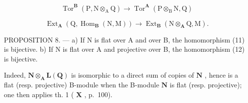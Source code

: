 \[
\operatorname{Tor} ^ {\mathbf {B}} (\mathrm{P}, \mathrm{N} \otimes_ {\mathrm{A}} \mathrm{Q}) \rightarrow \operatorname{Tor} ^ {\mathbf {A}} (\mathrm{P} \otimes_ {\mathrm{B}} \mathrm{N}, \mathrm{Q})\tag{12}
\]

\[
\operatorname{Ext} _ {\mathbf {A}} \left(\mathrm{Q}, \operatorname{Hom} _ {\mathbf {B}} (\mathrm{N}, \mathrm{M})\right)\rightarrow \operatorname{Ext} _ {\mathbf {B}} \left(\mathrm{N} \otimes_ {\mathbf {A}} \mathrm{Q}, \mathrm{M}\right).
\]

PROPOSITION 8. --- a) If N is flat over A and over B, the homomorphism (11) is bijective. b) If N is flat over A and projective over B, the homomorphism (12) is bijective.

Indeed, \(\mathbf{N} \otimes_{\mathbf{A}} \mathbf{L}(\mathbf{Q})\) is isomorphic to a direct sum of copies of \(\mathbf{N}\) , hence is a flat (resp. projective) B-module when the B-module \(\mathbf{N}\) is flat (resp. projective); one then applies th. 1 ( \(\mathbf{X}\) , p.~100).

